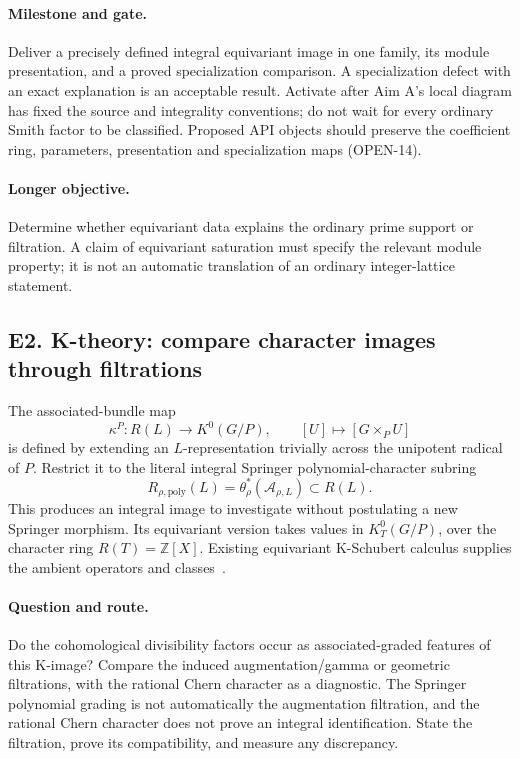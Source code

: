 \documentclass[11pt,letterpaper]{article}
\newcommand{\Z}{\mathbb Z}
\begin{document}
\paragraph{Milestone and gate.}
Deliver a precisely defined integral equivariant image in one family,
its module presentation, and a proved specialization comparison.
A specialization defect with an exact explanation is an acceptable result.
Activate after Aim A's local diagram has fixed the source and integrality
conventions; do not wait for every ordinary Smith factor to be classified.
Proposed API objects should preserve the coefficient ring, parameters,
presentation and specialization maps (OPEN-14).

\paragraph{Longer objective.}
Determine whether equivariant data explains the ordinary prime support
or filtration. A claim of equivariant saturation must specify the relevant
module property; it is not an automatic translation of an ordinary
integer-lattice statement.

\newpage
\subsection*{E2. K-theory: compare character images through filtrations}
The associated-bundle map
\[
 \kappa^P:R(L)\longrightarrow K^0(G/P),\qquad
 [U]\longmapsto[G\times_P U]
\]
is defined by extending an \(L\)-representation trivially across the
unipotent radical of \(P\). Restrict it to the literal integral
Springer polynomial-character subring
\[
 R_{\rho,\mathrm{poly}}(L)
   =\theta_\rho^*(\mathcal A_{\rho,L})\subset R(L).
\]
This produces an integral image to investigate without postulating a new
Springer morphism. Its equivariant version takes values in \(K_T^0(G/P)\),
over the character ring \(R(T)=\Z[X]\). Existing equivariant K-Schubert
calculus supplies the ambient operators and classes~\cite{Uma}.

\paragraph{Question and route.}
Do the cohomological divisibility factors occur as associated-graded
features of this K-image? Compare the induced augmentation/gamma or
geometric filtrations, with the rational Chern character as a diagnostic.
The Springer polynomial grading is not automatically the augmentation
filtration, and the rational Chern character does not prove an integral
identification. State the filtration, prove its compatibility, and
measure any discrepancy.
\end{document}
